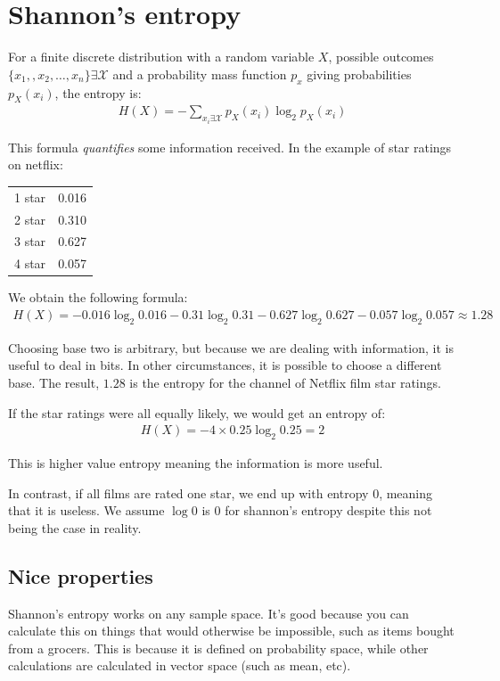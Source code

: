 \documentclass[11pt,a4paper,titlepage,dvipsnames,cmyk]{scrartcl}
\begin{document}
\section{Shannon's entropy}
For a finite discrete distribution with a random variable $X$, possible outcomes $\{x_1,, x_2, \dots, x_n\} \exists \mathcal{X}$ and a probability mass function $p_x$ giving probabilities $p_X(x_i)$, the entropy is:
\begin{align*}
H(X) = - \sum_{x_i \exists \mathcal{X}}p_X(x_i) \log_2 p_X(x_i)
\end{align*}

This formula \textit{quantifies} some information received. In the example of star ratings on netflix:

\begin{center}
\begin{tabular}{ll}
    \toprule
    1 star & 0.016 \\
    2 star & 0.310 \\
    3 star & 0.627 \\
    4 star & 0.057 \\ \bottomrule
\end{tabular}
\end{center}

We obtain the following formula:
\begin{align*}
H(X) = -0.016 \log_2 0.016 - 0.31 \log_2 0.31 - 0.627 \log_2 0.627 - 0.057 \log_2 0.057 \approx 1.28
\end{align*}

Choosing base two is arbitrary, but because we are dealing with information, it is useful to deal in bits. In other circumstances, it is possible to choose a different base. The result, $1.28$ is the entropy for the channel of Netflix film star ratings.

If the star ratings were all equally likely, we would get an entropy of:
\begin{align*}
H(X) = -4 \times 0.25 \log_2 0.25 = 2
\end{align*}

This is higher value entropy meaning the information is more useful.

In contrast, if all films are rated one star, we end up with entropy 0, meaning that it is useless. We assume $\log 0$ is 0 for shannon's entropy despite this not being the case in reality.

\subsection{Nice properties}
Shannon's entropy works on any sample space. It's good because you can calculate this on things that would otherwise be impossible, such as items bought from a grocers. This is because it is defined on probability space, while other calculations are calculated in vector space (such as mean, etc).
\end{document}
